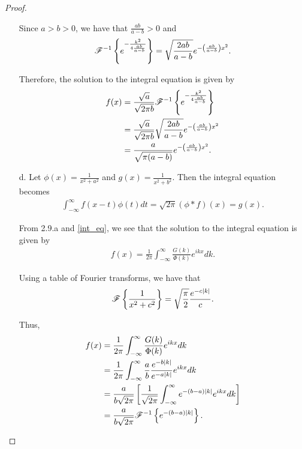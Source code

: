 \begin{proof}
\begin{enumerate}
      Since $a > b > 0$, we have that $\frac{ab}{a-b} > 0$ and
      \begin{align*}
        \mathscr{F}^{-1}\left\{ {e^{-\frac{k^2}{4\frac{ab}{a-b}}}} \right\} = \sqrt{\frac{2ab}{a-b}} e^{-\left(\frac{ab}{a-b}\right) x^2}.
      \end{align*}

      Therefore, the solution to the integral equation is given by
      \begin{align*}
        f(x) &= \frac{\sqrt{a}}{\sqrt{2\pi b}}\mathscr{F}^{-1}\left\{ {e^{-\frac{k^2}{4\frac{ab}{a-b}}}} \right\} \\
        &= \frac{\sqrt{a}}{\sqrt{2\pi b}} \sqrt{\frac{2ab}{a-b}} e^{-\left(\frac{ab}{a-b}\right) x^2} \\
        &= \frac{a}{\sqrt{\pi(a-b)}} e^{-\left(\frac{ab}{a-b}\right) x^2}.
      \end{align*}

    \item [d.] Let $\displaystyle \phi(x) = \frac{1}{x^2 + a^2}$ and $\displaystyle g(x) = \frac{1}{x^2 + b^2}$.
      Then the integral equation becomes
      \begin{align*}
        \int_{-\infty}^{\infty} f(x-t) \phi(t) dt = \sqrt{2\pi}(\phi \ast f)(x) = g(x).
      \end{align*}

      From 2.9.a and \eqref{int_eq}, we see that the solution to the integral equation is given by
      \begin{align*}
        f(x) = \frac{1}{2\pi} \int_{-\infty}^{\infty}\frac{G(k)}{\Phi(k)}e^{ikx} dk.
      \end{align*}

      Using a table of Fourier transforms, we have that
      \begin{align*}
        \mathscr{F}\left\{ {\frac{1}{x^2 + c^2}} \right\} = \sqrt{\frac{\pi}{2}} \frac{ e ^{-c |k|}}{c}.
      \end{align*}

      Thus,
      \begin{align*}
        f(x) &= \frac{1}{2\pi} \int_{-\infty}^{\infty} \frac{G(k)}{\Phi(k)}e^{ikx} dk \\
        &= \frac{1}{2\pi} \int_{-\infty}^{\infty} \frac{a}{b} \frac{e^{-b|k|}}{e^{-a|k|}}e^{ikx} dk \\
        &= \frac{a}{b\sqrt{2\pi}}\left[\frac{1}{\sqrt{2\pi}} \int_{-\infty}^{\infty}e^{-(b-a)|k|}e^{ikx}dk \right] \\
        &= \frac{a}{b\sqrt{2\pi}} \mathscr{F}^{-1}\left\{ {e^{-(b-a)|k|}} \right\}.
      \end{align*}


\end{enumerate}
\end{proof}
